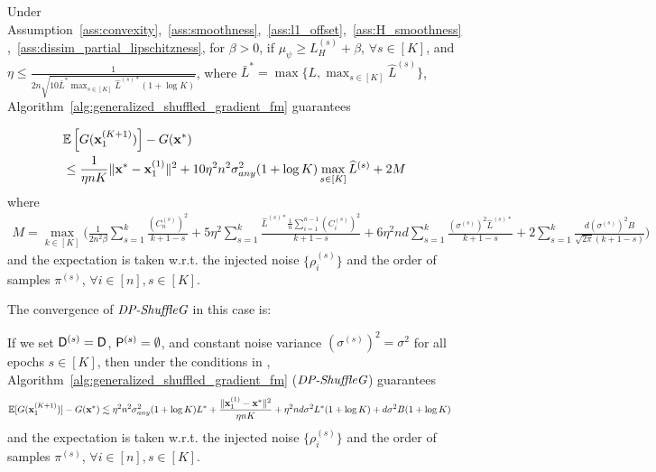 \begin{theorem}
\label{thm:convergence_l1}
    Under Assumption~\ref{ass:convexity},~\ref{ass:smoothness},~\ref{ass:l1_offset},~\ref{ass:H_smoothness},~\ref{ass:dissim_partial_lipschitzness}, for $\beta > 0$, 
    if $\mu_{\psi} \geq L_H^{(s)} + \beta$, $\forall s\in [K]$, and 
     $\eta \leq \frac{1}{2n \sqrt{10 \bar{L}^* \max_{s\in [K]}\widehat{L}^{(s)*} (1+\log K)}}$, 
    where $\bar{L}^* = \max\{L, \max_{s\in[K]} \widehat{L}^{(s)}\}$,
    Algorithm~\ref{alg:generalized_shuffled_gradient_fm} guarantees

    \begin{align}
        &\mathbb{E}\left[ G({\mathbf{x}}_1^{(K+1)}) \right] - G({\mathbf{x}}^*)\\
        \nonumber
        &\leq \frac{1}{\eta n K}\|{\mathbf{x}}^* - {\mathbf{x}}_1^{(1)}\|^2
        + 10 \eta^2 n^2 \sigma_{any}^2 (1+\log K)\max_{s\in[K]} \widehat{L}^{(s)} + 2 M
    \end{align}
    where
    \begin{align*}
        M = \max_{k\in [K]} \Big(
        \frac{1}{2n^2 \beta}\sum_{s=1}^{k} \frac{ (C_n^{(s)})^2 }{k+1-s}
        + 5\eta^2 \sum_{s=1}^{k} \frac{ \widehat{L}^{(s)*} \frac{1}{n}\sum_{i=1}^{n-1}(C_i^{(s)})^2} {k+1-s}
        + 6\eta^2 nd \sum_{s=1}^{k} \frac{ (\sigma^{(s)})^2 \widehat{L}^{(s)*} }{k+1-s} 
        + 2\sum_{s=1}^{k} \frac{d (\sigma^{(s)})^2 B}{\sqrt{2\pi}(k+1-s)}\Big)
    \end{align*}
    and the expectation is taken w.r.t. the injected noise $\{\rho_i^{(s)}\}$ and the order of samples $\pi^{(s)}$, $\forall i\in [n], s\in [K]$.
\end{theorem}

The convergence of $\textit{DP-ShuffleG}$ in this case is:
\begin{corollary}
\label{corollary:convergence_dpsg}
    If we set 
    ${\mathsf{D}}^{(s)} = {\mathsf{D}}$, ${\mathsf{P}}^{(s)} = \emptyset$, and constant noise variance $(\sigma^{(s)})^2 = \sigma^2$ for all epochs $s\in [K]$,
    then under the conditions in , Algorithm~\ref{alg:generalized_shuffled_gradient_fm} ($\textit{DP-ShuffleG}$) guarantees
    \begin{align*}
        & \mathbb{E} [G({\mathbf{x}}_1^{(K+1)})] - G({\mathbf{x}}^*)
        \lesssim \eta^2 n^2 \sigma_{any}^2 (1+\log K) L^*  + \frac{\|{\mathbf{x}}_1^{(1)} - {\mathbf{x}}^{*}\|^2}{\eta n K} + \eta^2 n d \sigma^2 L^{*} (1 + \log K)
        + d \sigma^2 B (1+\log K)
    \end{align*}
    and the expectation is taken w.r.t. the injected noise $\{\rho_i^{(s)}\}$ and the order of samples $\pi^{(s)}$, $\forall i\in [n], s\in [K]$.
\end{corollary}

